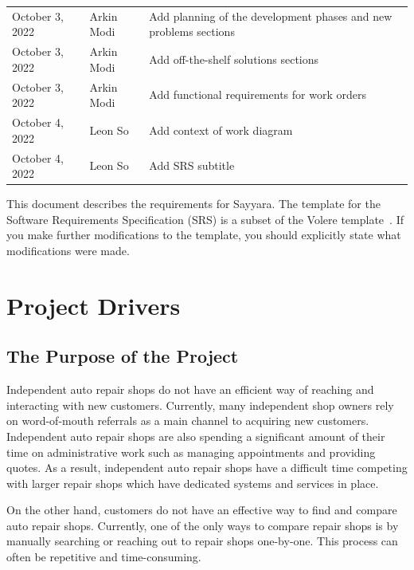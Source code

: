 \documentclass[12pt]{article}
\begin{document}
\begin{table}[hp]
\begin{tabularx}{\textwidth}{llX}
		October 3, 2022    & Arkin Modi            & Add planning of the development phases and new problems sections                   \\
		October 3, 2022    & Arkin Modi            & Add off-the-shelf solutions sections                                               \\
		October 3, 2022    & Arkin Modi            & Add functional requirements for work orders                                        \\
		October 4, 2022    & Leon So               & Add context of work diagram                                                        \\
		October 4, 2022    & Leon So               & Add SRS subtitle                                                                   \\
		\bottomrule
	\end{tabularx}
\end{table}

\newpage


This document describes the requirements for Sayyara. The template for the Software Requirements
Specification (SRS) is a subset of the Volere template~\citep{RobertsonAndRobertson2012}. If you
make further modifications to the template, you should explicitly state what modifications were
made.

\section{Project Drivers}

\subsection{The Purpose of the Project}

Independent auto repair shops do not have an efficient way of reaching and interacting with new
customers. Currently, many independent shop owners rely on word-of-mouth referrals as a main
channel to acquiring new customers. Independent auto repair shops are also spending a significant
amount of their time on administrative work such as managing appointments and providing quotes. As
a result, independent auto repair shops have a difficult time competing with larger repair shops
which have dedicated systems and services in place.

On the other hand, customers do not have an effective way to find and compare auto repair shops.
Currently, one of the only ways to compare repair shops is by manually searching or reaching out to
repair shops one-by-one. This process can often be repetitive and time-consuming.
\end{document}
